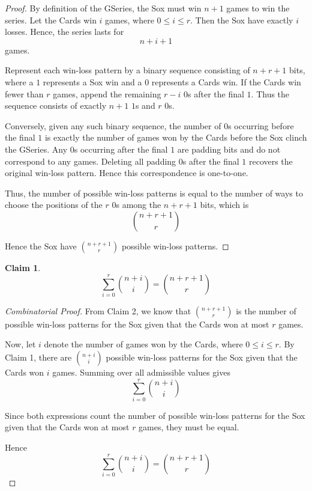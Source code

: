 \documentclass{article}
\newtheorem{claim}{Claim}
\begin{document}
\begin{proof}
    By definition of the GSeries, the Sox must win $n + 1$ games to win the series. Let the Cards win
    $i$ games, where $0 \leq i \leq r$. Then the Sox have exactly $i$ losses. Hence, the series lasts 
    for
    \[
    n + i + 1
    \]
    games.

    \medskip

    Represent each win-loss pattern by a binary sequence consisting of $n + r + 1$ bits, where a $1$ 
    represents a Sox win and a $0$ represents a Cards win. If the Cards win fewer than $r$ games, 
    append the remaining $r - i$ $0$s after the final $1$. Thus the sequence consists of exactly 
    $n + 1$ $1$s and $r$ $0$s.

    \medskip

    Conversely, given any such binary sequence, the number of $0$s occurring before the final $1$
    is exactly the number of games won by the Cards before the Sox clinch the GSeries. Any $0$s 
    occurring after the final $1$ are padding bits and do not correspond to any games. Deleting 
    all padding $0$s after the final $1$ recovers the original win-loss pattern. Hence this 
    correspondence is one-to-one.

    \medskip

    Thus, the number of possible win-loss patterns is equal to the number of ways to choose the 
    positions of the $r$ $0$s among the $n + r + 1$ bits, which is
    \[
    \binom{n + r + 1}{r}
    \]

    \medskip

    Hence the Sox have $\binom{n + r + 1}{r}$ possible win-loss patterns.
\end{proof}

\begin{claim}
    \[
    \sum_{i=0}^{r}\binom{n + i}{i} = \binom{n + r + 1}{r}
    \]
\end{claim}

\begin{proof}[Combinatorial Proof]
    From Claim 2, we know that $\binom{n + r + 1}{r}$ is the number of possible win-loss patterns 
    for the Sox given that the Cards won at most $r$ games.

    \medskip

    Now, let $i$ denote the number of games won by the Cards, where $0 \leq i \leq r$. By Claim 1, 
    there are $\binom{n + i}{i}$ possible win-loss patterns for the Sox given that the Cards won 
    $i$ games. Summing over all admissible values gives
    \[
    \sum_{i=0}^{r}\binom{n + i}{i}
    \]

    \medskip

    Since both expressions count the number of possible win-loss patterns for the Sox given that 
    the Cards won at most $r$ games, they must be equal.

    \medskip

    Hence
    \[
    \sum_{i=0}^{r}\binom{n + i}{i} = \binom{n + r + 1}{r}
    \]
\end{proof}
\end{document}
